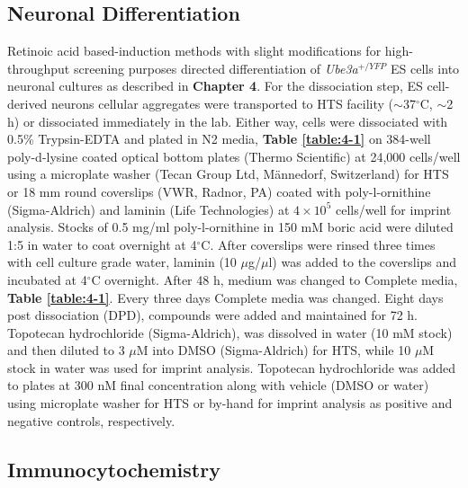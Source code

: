 \subsection{Neuronal Differentiation}

Retinoic acid based-induction methods \cite{Bibel2007,Kiris2011,Wu2012} with slight modifications for high-throughput screening purposes directed differentiation of \textit{Ube3a$^{+/YFP}$} ES cells into neuronal cultures as described in \textbf{Chapter 4}. For the dissociation step, ES cell-derived neurons cellular aggregates were transported to HTS facility ($\sim$37$^{\circ}$C, $\sim$2 h) or dissociated immediately in the lab. Either way, cells were dissociated with 0.5\% Trypsin-EDTA and plated in N2 media, \textbf{Table \ref{table:4-1}} on 384-well poly-d-lysine coated optical bottom plates (Thermo Scientific) at 24,000 cells/well using a microplate washer (Tecan Group Ltd, M\"{a}nnedorf, Switzerland) for HTS or 18 mm round coverslips (VWR, Radnor, PA) coated with poly-l-ornithine (Sigma-Aldrich) and laminin (Life Technologies) at $4 \times 10^5$ cells/well for imprint analysis. Stocks of 0.5 mg/ml poly-l-ornithine in 150 mM boric acid were diluted 1:5 in water to coat overnight at 4$^{\circ}$C. After coverslips were rinsed three times with cell culture grade water, laminin (10 $\mu$g/$\mu$l) was added to the coverslips and incubated at 4$^{\circ}$C overnight. After 48 h, medium was changed to Complete media, \textbf{Table \ref{table:4-1}}. Every three days Complete media was changed. Eight days post dissociation (DPD), compounds were added and maintained for 72 h. Topotecan hydrochloride (Sigma-Aldrich), was dissolved in water (10 mM stock) and then diluted to 3 $\mu$M into DMSO (Sigma-Aldrich) for HTS, while 10 $\mu$M stock in water was used for imprint analysis. Topotecan hydrochloride was added to plates at 300 nM final concentration along with vehicle (DMSO or water) using microplate washer for HTS or by-hand for imprint analysis as positive and negative controls, respectively.

\subsection{Immunocytochemistry}


